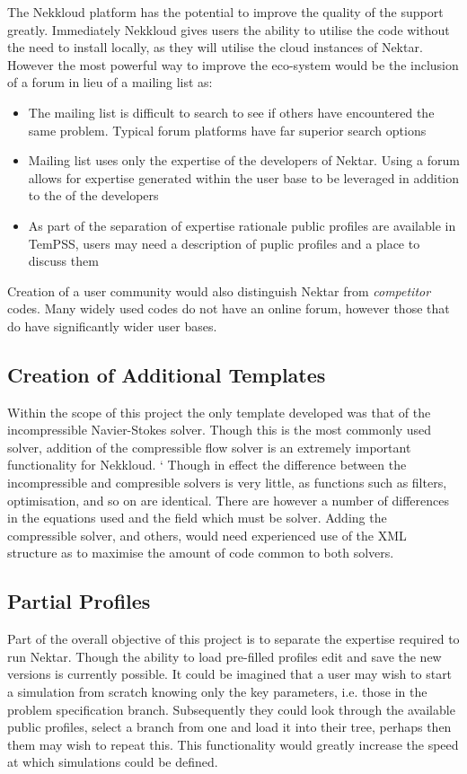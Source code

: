 \documentclass[11pt, a4paper]{report}
\begin{document}
The Nekkloud platform has the potential to improve the quality of the support greatly. Immediately Nekkloud gives users the ability to utilise the code without the need to install locally, as they will utilise the cloud instances of Nektar. However the most powerful way to improve the eco-system would be the inclusion of a forum in lieu of a mailing list as:
\begin{itemize}
\item The mailing list is difficult to search to see if others have encountered the same problem. Typical forum platforms have far superior search options
\item Mailing list uses only the expertise of the developers of Nektar. Using a forum allows for expertise generated within the user base to be leveraged in addition to the of the developers
\item As part of the separation of expertise rationale public profiles are available in TemPSS, users may need a description of puplic profiles and a place to discuss them
\end{itemize}

Creation of a user community would also distinguish Nektar from \textit{competitor} codes. Many widely used codes do not have an online forum, however those that do have significantly wider user bases.

\subsection{Creation of Additional Templates}
Within the scope of this project the only template developed was that of the incompressible Navier-Stokes solver. Though this is the most commonly used solver, addition of the compressible flow solver is an extremely important functionality for Nekkloud.
`
Though in effect the difference between the incompressible and compresible solvers is very little, as functions such as filters, optimisation, and so on are identical. There are however a number of differences in the equations used and the field which must be solver. Adding the compressible solver, and others, would need experienced use of the XML structure as to maximise the amount of code common to both solvers.

\subsection{Partial Profiles}
Part of the overall objective of this project is to separate the expertise required to run Nektar. Though the ability to load pre-filled profiles edit and save the new versions is currently possible. It could be imagined that a user may wish to start a simulation from scratch knowing only the key parameters, i.e. those in the problem specification branch. Subsequently they could look through the available public profiles, select a branch from one and load it into their tree, perhaps then them may wish to repeat this. This functionality would greatly increase the speed at which simulations could be defined.
\end{document}
